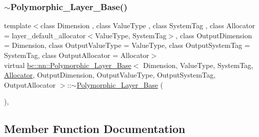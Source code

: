 \mbox{\label{structbc_1_1nn_1_1Polymorphic__Layer__Base_a6d3d973826a90e84e1f1ef3127198388}} 
\subsubsection{\texorpdfstring{$\sim$\+Polymorphic\+\_\+\+Layer\+\_\+\+Base()}{~Polymorphic\_Layer\_Base()}\hspace{0.1cm}{\footnotesize\ttfamily [2/2]}}
{\footnotesize\ttfamily template$<$class Dimension , class Value\+Type , class System\+Tag , class Allocator  = layer\+\_\+default\+\_\+allocator$<$\+Value\+Type, System\+Tag$>$, class Output\+Dimension  = Dimension, class Output\+Value\+Type  = Value\+Type, class Output\+System\+Tag  = System\+Tag, class Output\+Allocator  = Allocator$>$ \\
virtual \hyperlink{structbc_1_1nn_1_1Polymorphic__Layer__Base}{bc\+::nn\+::\+Polymorphic\+\_\+\+Layer\+\_\+\+Base}$<$ Dimension, Value\+Type, System\+Tag, \hyperlink{classbc_1_1allocators_1_1Allocator}{Allocator}, Output\+Dimension, Output\+Value\+Type, Output\+System\+Tag, Output\+Allocator $>$\+::$\sim$\hyperlink{structbc_1_1nn_1_1Polymorphic__Layer__Base}{Polymorphic\+\_\+\+Layer\+\_\+\+Base} (\begin{DoxyParamCaption}{ }\end{DoxyParamCaption})\hspace{0.3cm}{\ttfamily [virtual]}, {\ttfamily [default]}}



\subsection{Member Function Documentation}
\mbox{\label{structbc_1_1nn_1_1Polymorphic__Layer__Base_ae68fb249544a51c79be7aca6fb4a0727}} 
